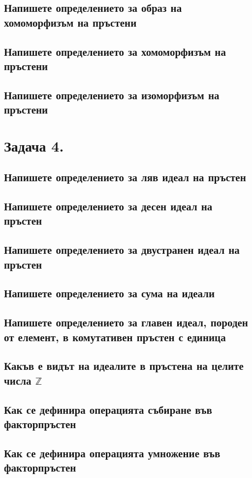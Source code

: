 \documentclass[10pt]{article}
\newcommand*{\Z}{\mathbb{Z}}
\begin{document}
\subsection*{Напишете определението за образ на хомоморфизъм на пръстени}
\subsection*{Напишете определението за хомоморфизъм на пръстени}
\subsection*{Напишете определението за изоморфизъм на пръстени}

\section*{Задача 4.}
\subsection*{Напишете определението за ляв идеал на пръстен}
\subsection*{Напишете определението за десен идеал на пръстен}
\subsection*{Напишете определението за двустранен идеал на пръстен}
\subsection*{Напишете определението за сума на идеали}
\subsection*{Напишете определението за главен идеал, породен от елемент, в комутативен пръстен с единица}
\subsection*{Какъв е видът на идеалите в пръстена на целите числа $\Z$}
\subsection*{Как се дефинира операцията събиране във факторпръстен}
\subsection*{Как се дефинира операцията умножение във факторпръстен}
\end{document}
